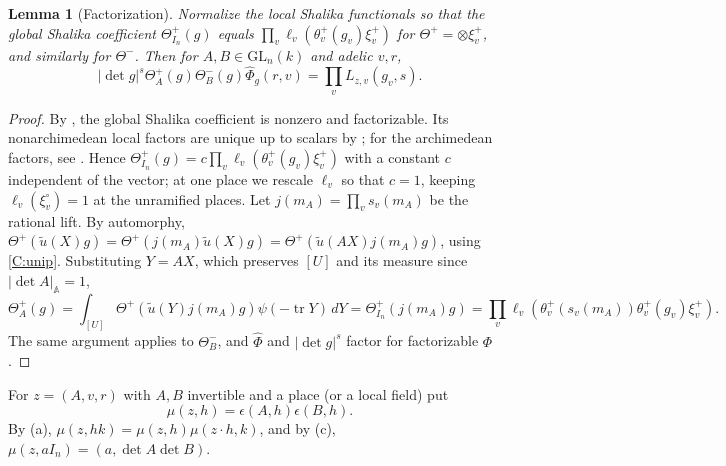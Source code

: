 \documentclass[11pt,oneside,notitlepage]{book}
\numberwithin{equation}{section}
\theoremstyle{plain}
\newtheorem{lemma}[theorem]{Lemma}
\theoremstyle{definition}
\newtheorem{remark}[theorem]{Remark}
\newcommand{\A}{\mathbb{A}}
\newcommand{\GL}{\mathrm{GL}}
\newcommand{\tr}{\operatorname{tr}}
\newcommand{\hil}[2]{(#1,#2)}
\begin{document}
\begin{lemma}[Factorization]\label{lem:factor}
Normalize the local Shalika functionals so that the global Shalika coefficient $\Theta^+_{I_n}(g)$ equals $\prod_v\ell_v(\theta^+_v(g_v)\xi^+_v)$ for $\Theta^+=\otimes\xi_v^+$, and similarly for $\Theta^-$. Then for $A,B\in\GL_n(k)$ and adelic $v,r$,
\[|\det g|^s\Theta^+_A(g)\Theta^-_B(g)\widehat\Phi_g(r,v)=\prod_vL_{z,v}(g_v,s).\]
\end{lemma}
\begin{proof}
By \cite[Theorem 4.22]{KM}, the global Shalika coefficient is nonzero and factorizable. Its nonarchimedean local factors are unique up to scalars by \cite[Theorem 3.1 and Remark 3.2]{Kaplan}; for the archimedean factors, see \cite[§4.2]{KM}. Hence $\Theta^+_{I_n}(g)=c\prod_v\ell_v(\theta_v^+(g_v)\xi^+_v)$ with a constant $c$ independent of the vector; at one place we rescale $\ell_v$ so that $c=1$, keeping $\ell_v(\xi_v^\circ)=1$ at the unramified places. Let $j(m_A)=\prod_vs_v(m_A)$ be the rational lift. By automorphy, $\Theta^+(\tilde u(X)g)=\Theta^+(j(m_A)\tilde u(X)g)=\Theta^+(\tilde u(AX)j(m_A)g)$, using \ref{C:unip}. Substituting $Y=AX$, which preserves $[U]$ and its measure since $|\det A|_\A=1$,
\[\Theta^+_A(g)=\int_{[U]}\Theta^+(\tilde u(Y)j(m_A)g)\psi(-\tr Y)\,dY=\Theta^+_{I_n}(j(m_A)g)=\prod_v\ell_v(\theta_v^+(s_v(m_A))\theta^+_v(g_v)\xi^+_v).\]
The same argument applies to $\Theta^-_B$, and $\widehat\Phi$ and $|\det g|^s$ factor for factorizable $\Phi$.
\end{proof}

	For $z=(A,v,r)$ with $A,B$ invertible and a place (or a local field) put
\begin{equation}\label{eq:mu}
	\mu(z,h)=\epsilon(A,h)\epsilon(B,h).
\end{equation}
By (a), $\mu(z,hk)=\mu(z,h)\mu(z\cdot h,k)$, and by (c), $\mu(z,aI_n)=\hil{a}{\det A\det B}$.
\end{document}
